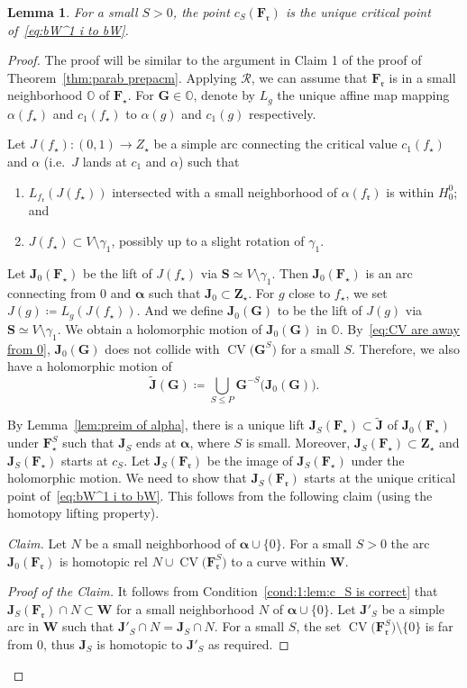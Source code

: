 \documentclass{amsart}
\newcommand{\1}{{\mathbb 1 }}
\newcommand{\bO}{{\mathbb{O}}}
\newcommand\RR{\mathcal{R}}
\newcommand{\bF}{{\mathbf F}}
\newcommand{\bZ}{{\mathbf Z}}
\newcommand{\bW}{{\mathbf W}}
\newcommand{\bJ}{{\mathbf J}}
\newcommand{\bS}{{\mathbf S}}
\newcommand{\bG}{{\mathbf G}}
\newcommand{\str}{{\star}}
\newcommand{\rr}{\mathfrak{r}}
\newtheorem{lem}[thm]{Lemma}
\theoremstyle{remark}
\numberwithin{equation}{section}
\theoremstyle{definition}
\newcommand{\CV}{{\operatorname{CV}}}
\newcommand{\balpha}{{\boldsymbol \alpha}}
\theoremstyle{nonumberbreak}
\begin{document}
\begin{lem}
\label{lem:c_S is correct}
For a small $S>0$, the point $c_S(\bF_\rr)$ is the unique critical point of~\eqref{eq:bW^1 i to bW}.
\end{lem}
\begin{proof}
The proof will be similar to the argument in Claim 1 of the proof of Theorem~\ref{thm:parab prepacm}. Applying $\RR$, we can assume that $\bF_\rr$ is in a small neighborhood $\bO$ of $\bF_\str$. For $\bG\in \bO$, denote by $L_g$ the unique affine map mapping $\alpha(f_\str)$ and $c_1(f_\str)$ to $\alpha(g)$ and $c_1(g)$ respectively.

Let $J(f_\str)\colon (0,1)\to Z_\str$ be a simple arc connecting the critical value $c_1(f_\str)$ and $\alpha$ (i.e.~$J$ lands at $c_1$ and $\alpha$) such that
\begin{enumerate}

\item $L_{f_\rr}(J(f_\str))$ intersected with a small neighborhood of $\alpha(f_\rr)$ is within $H^0_0$; and\label{cond:1:lem:c_S is correct}
\item $J(f_\str)\subset V\setminus \gamma_1$, possibly up to a slight rotation of $\gamma_1.$
\end{enumerate}
 Let $\bJ_0(\bF_\str)$ be the lift of $J(f_\str)$ via $\bS\simeq V\setminus \gamma_1$. Then $\bJ_0(\bF_\str)$ is an arc connecting from $0$ and $\balpha$ such that $\bJ_0\subset \bZ_\str$. For $g$ close to $f_\str$, we set $J(g)\coloneqq  L_g (J(f_\str))$. And we define $\bJ_0(\bG)$ to be the lift of $J(g)$ via $\bS\simeq V\setminus \gamma_1$. We obtain a holomorphic motion of $\bJ_0(\bG)$ in $ \bO$. By~\eqref{eq:CV are away from 0}, $\bJ_0(\bG)$ does not collide with $\CV\big(\bG^S\big)$ for a small $S$. Therefore, we also have a holomorphic motion of \[\widetilde \bJ(\bG) \coloneqq\displaystyle{ \bigcup_{S\le P}} \bG^{-S} \big( \bJ_0(\bG) \big).\]
 
 By Lemma~\ref{lem:preim of alpha}, there is a unique lift $\bJ_S(\bF_\str)\subset \widetilde \bJ$ of $\bJ_0(\bF_\str)$ under $\bF^S_\str$ such that $\bJ_S$ ends at $\balpha$, where $S$ is small. Moreover, $\bJ_S(\bF_\str)\subset\bZ_\str$ and $\bJ_S(\bF_\str)$ starts at $c_S$. Let $\bJ_S(\bF_\rr)$ be the image of $\bJ_S(\bF_\str)$ under the holomorphic motion.  We need to show that $\bJ_S(\bF_\rr)$  starts at the unique critical point of~\eqref{eq:bW^1 i to bW}. This follows from the following claim (using the homotopy lifting property).

\emph{Claim.} Let $N$ be a small neighborhood of $\balpha\cup \{0\}$. For a small $S>0$ the arc $\bJ_0(\bF_\rr)$ is homotopic rel $N\cup \CV\big(\bF_\rr^S\big)$ to a curve within $\bW$.
\begin{proof}[Proof of the Claim]
It follows from Condition~\eqref{cond:1:lem:c_S is correct} that $\bJ_S(\bF_\rr)\cap N\subset \bW$ for a small neighborhood $N$ of $\balpha\cup \{0\}$. Let $\bJ'_S$ be a simple arc in $\bW$ such that $\bJ'_S\cap N=\bJ_S \cap N$. For a small $S$, the set $\CV\big(\bF_\rr^S\big)\setminus \{0\}$ is far from $0$, thus $\bJ_S$ is homotopic to $\bJ'_S$ as required.
\end{proof}


\end{proof}
\end{document}
